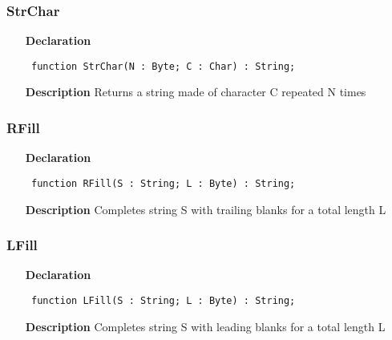 \documentclass[12pt,a4paper,oneside]{report}
\newcommand{\declarationitem}[1]{\textbf{#1}}
\newcommand{\descriptiontitle}[1]{\textbf{#1}}
\newcommand{\code}[1]{\texttt{#1}}
\begin{document}
\subsubsection{StrChar}
\label{ustrings-StrChar}
\begin{itemize}\item[\declarationitem{Declaration}\hfill]
	\begin{flushleft}
		\code{
			function StrChar(N : Byte; C : Char) : String;}
		
	\end{flushleft}
	
	\par
	\item[\descriptiontitle{Description}]
	Returns a string made of character C repeated N times
	
\end{itemize}
\subsubsection{RFill}
\label{ustrings-RFill}
\begin{itemize}\item[\declarationitem{Declaration}\hfill]
	\begin{flushleft}
		\code{
			function RFill(S : String; L : Byte) : String;}
		
	\end{flushleft}
	
	\par
	\item[\descriptiontitle{Description}]
	Completes string S with trailing blanks for a total length L
	
\end{itemize}
\subsubsection{LFill}
\label{ustrings-LFill}
\begin{itemize}\item[\declarationitem{Declaration}\hfill]
	\begin{flushleft}
		\code{
			function LFill(S : String; L : Byte) : String;}
		
	\end{flushleft}
	
	\par
	\item[\descriptiontitle{Description}]
	Completes string S with leading blanks for a total length L
	
\end{itemize}
\end{document}
